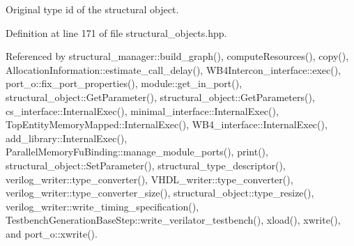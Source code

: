 Original type id of the structural object. 



Definition at line 171 of file structural\+\_\+objects.\+hpp.



Referenced by structural\+\_\+manager\+::build\+\_\+graph(), compute\+Resources(), copy(), Allocation\+Information\+::estimate\+\_\+call\+\_\+delay(), W\+B4\+Intercon\+\_\+interface\+::exec(), port\+\_\+o\+::fix\+\_\+port\+\_\+properties(), module\+::get\+\_\+in\+\_\+port(), structural\+\_\+object\+::\+Get\+Parameter(), structural\+\_\+object\+::\+Get\+Parameters(), cs\+\_\+interface\+::\+Internal\+Exec(), minimal\+\_\+interface\+::\+Internal\+Exec(), Top\+Entity\+Memory\+Mapped\+::\+Internal\+Exec(), W\+B4\+\_\+interface\+::\+Internal\+Exec(), add\+\_\+library\+::\+Internal\+Exec(), Parallel\+Memory\+Fu\+Binding\+::manage\+\_\+module\+\_\+ports(), print(), structural\+\_\+object\+::\+Set\+Parameter(), structural\+\_\+type\+\_\+descriptor(), verilog\+\_\+writer\+::type\+\_\+converter(), V\+H\+D\+L\+\_\+writer\+::type\+\_\+converter(), verilog\+\_\+writer\+::type\+\_\+converter\+\_\+size(), structural\+\_\+object\+::type\+\_\+resize(), verilog\+\_\+writer\+::write\+\_\+timing\+\_\+specification(), Testbench\+Generation\+Base\+Step\+::write\+\_\+verilator\+\_\+testbench(), xload(), xwrite(), and port\+\_\+o\+::xwrite().

\mbox{\label{structstructural__type__descriptor_a50fe2436b72165b16658d68bf2af985c}} 
